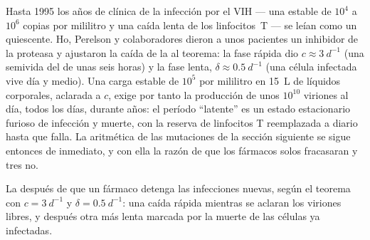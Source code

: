 \begin{example}\label{ex:b3:virology:hiv}
Hasta 1995 los años de  clínica de la infección por el VIH ---
una  estable de $10^{4}$ a $10^{6}$ copias por mililitro y
una caída lenta de los linfocitos~T --- se leían como un  quiescente.
Ho, Perelson y colaboradores dieron a unos pacientes un inhibidor de la
proteasa y ajustaron la caída de la  al teorema: la fase
rápida dio $c \approx \qty{3}{d^{-1}}$ (una semivida del  de unas
seis horas) y la fase lenta, $\delta \approx
\qty{0.5}{d^{-1}}$ (una célula infectada vive día y medio). Una carga
estable de $10^{5}$ por mililitro en \qty{15}{L} de líquidos corporales,
aclarada a $c$, exige por tanto la producción de unos $10^{10}$ viriones
al día, todos los días, durante años: el período ``latente'' es un estado
estacionario furioso de infección y muerte, con la reserva de linfocitos
T reemplazada a diario hasta que falla. La aritmética de las mutaciones
de la sección siguiente se sigue entonces de inmediato, y con ella la
razón de que los fármacos solos fracasaran y tres no.
\end{example}

\begin{omfigure}

{\small La  después de que un fármaco detenga las infecciones
nuevas, según el teorema con $c = \qty{3}{d^{-1}}$ y
$\delta = \qty{0.5}{d^{-1}}$: una caída rápida mientras se aclaran los
viriones libres, y después otra más lenta marcada por la muerte de las
células ya infectadas.}
\end{omfigure}

